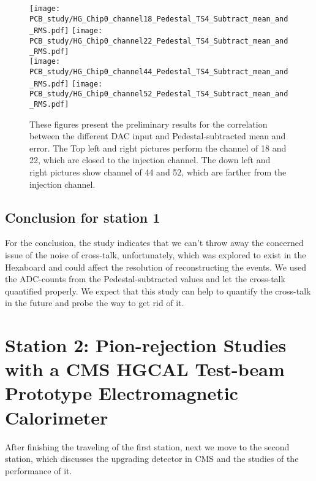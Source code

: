 \documentclass[12pt,twoside,a4paper,an,final]{cms-tdr}
\begin{document}
\begin{figure}[!htb]
\centering
     \texttt{[image: PCB\_study/HG\_Chip0\_channel18\_Pedestal\_TS4\_Subtract\_mean\_and\_RMS.pdf]}
     \texttt{[image: PCB\_study/HG\_Chip0\_channel22\_Pedestal\_TS4\_Subtract\_mean\_and\_RMS.pdf]}\\
     \texttt{[image: PCB\_study/HG\_Chip0\_channel44\_Pedestal\_TS4\_Subtract\_mean\_and\_RMS.pdf]}
     \texttt{[image: PCB\_study/HG\_Chip0\_channel52\_Pedestal\_TS4\_Subtract\_mean\_and\_RMS.pdf]}
\caption{These figures present the preliminary results for the correlation between the different DAC input and Pedestal-subtracted mean and error. The Top left and right pictures perform the channel of 18 and 22, which are closed to the injection channel. The down left and right pictures show channel of 44 and 52, which are farther from the injection channel.}
\label{fig:PCB_injection_pulse_study}
\end{figure}

\subsection{Conclusion for station 1}
For the conclusion, the study indicates that we can't throw away the concerned issue of the noise of cross-talk, unfortunately, which was explored to exist in the Hexaboard and could affect the resolution of reconstructing the events. We used the ADC-counts from the Pedestal-subtracted values and let the cross-talk quantified properly. We expect that this study can help to quantify the cross-talk in the future and probe the way to get rid of it.

\section{Station 2: Pion-rejection Studies with a CMS HGCAL Test-beam Prototype Electromagnetic Calorimeter}
After finishing the traveling of the first station, next we move to the second station, which discusses the upgrading detector in CMS and the studies of the performance of it.\\
\end{document}
